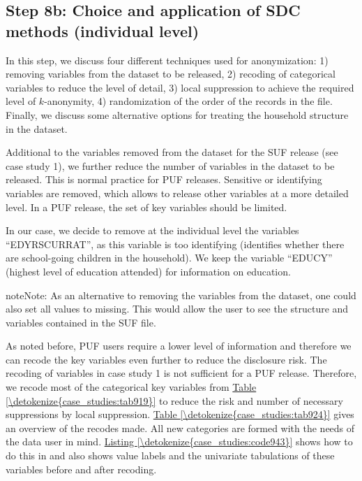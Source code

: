 \documentclass[letterpaper,10pt,english]{sphinxmanual}
\begin{document}
\subsection{Step 8b: Choice and application of SDC methods (individual level)}
\label{\detokenize{case_studies:id12}}
In this step, we discuss four different techniques used for
anonymization: 1) removing variables from the dataset to be released, 2)
recoding of categorical variables to reduce the level of detail, 3)
local suppression to achieve the required level of \(k\)-anonymity,
4) randomization of the order of the records in the file. Finally, we
discuss some alternative options for treating the household structure in
the dataset.


Additional to the variables removed from the dataset for the SUF release
(see case study 1), we further reduce the number of variables in the
dataset to be released. This is normal practice for PUF releases.
Sensitive or identifying variables are removed, which allows to release
other variables at a more detailed level. In a PUF release, the set of
key variables should be limited.

In our case, we decide to remove at the individual level the variables
“EDYRSCURRAT”, as this variable is too identifying (identifies whether
there are school-going children in the household). We keep the variable
“EDUCY” (highest level of education attended) for information on
education.

\begin{sphinxadmonition}{note}{Note:}
As an alternative to removing the variables from the
dataset, one could also set all values to missing. This would allow the
user to see the structure and variables contained in the SUF file.
\end{sphinxadmonition}


As noted before, PUF users require a lower level of information and
therefore we can recode the key variables even further to reduce the
disclosure risk. The recoding of variables in case study 1 is not
sufficient for a PUF release. Therefore, we recode most of the
categorical key variables from \hyperref[\detokenize{case_studies:tab919}]{Table \ref{\detokenize{case_studies:tab919}}} to reduce the risk and number
of necessary suppressions by local suppression. \hyperref[\detokenize{case_studies:tab924}]{Table \ref{\detokenize{case_studies:tab924}}} gives an
overview of the recodes made. All new categories are formed with the
needs of the data user in mind. \hyperref[\detokenize{case_studies:code943}]{Listing \ref{\detokenize{case_studies:code943}}} shows how to do this in 
and also shows value labels and the univariate tabulations of these
variables before and after recoding.
\end{document}
